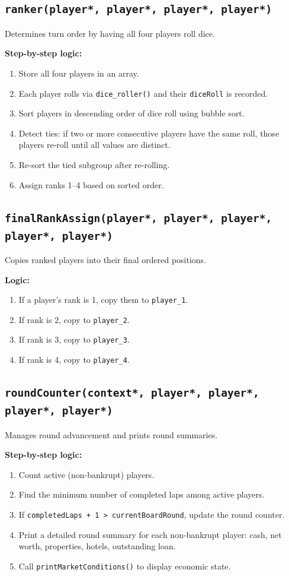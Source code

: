 \documentclass[12pt,a4paper]{article}
\begin{document}
\subsection{\texttt{ranker(player*, player*, player*, player*)}}
Determines turn order by having all four players roll dice.

\textbf{Step-by-step logic:}
\begin{enumerate}[noitemsep]
    \item Store all four players in an array.
    \item Each player rolls via \texttt{dice\_roller()} and their \texttt{diceRoll} is recorded.
    \item Sort players in descending order of dice roll using bubble sort.
    \item Detect ties: if two or more consecutive players have the same roll, those players re-roll until all values are distinct.
    \item Re-sort the tied subgroup after re-rolling.
    \item Assign ranks 1--4 based on sorted order.
\end{enumerate}

\subsection{\texttt{finalRankAssign(player*, player*, player*, player*, player*)}}
Copies ranked players into their final ordered positions.

\textbf{Logic:}
\begin{enumerate}[noitemsep]
    \item If a player's rank is 1, copy them to \texttt{player\_1}.
    \item If rank is 2, copy to \texttt{player\_2}.
    \item If rank is 3, copy to \texttt{player\_3}.
    \item If rank is 4, copy to \texttt{player\_4}.
\end{enumerate}

\subsection{\texttt{roundCounter(context*, player*, player*, player*, player*)}}
Manages round advancement and prints round summaries.

\textbf{Step-by-step logic:}
\begin{enumerate}[noitemsep]
    \item Count active (non-bankrupt) players.
    \item Find the minimum number of completed laps among active players.
    \item If \texttt{completedLaps + 1 > currentBoardRound}, update the round counter.
    \item Print a detailed round summary for each non-bankrupt player: cash, net worth, properties, hotels, outstanding loan.
    \item Call \texttt{printMarketConditions()} to display economic state.
\end{enumerate}
\end{document}
